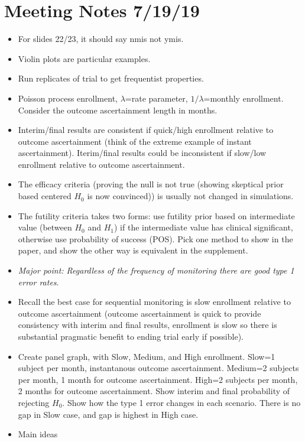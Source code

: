 \documentclass[12pt]{article}
\begin{document}
\section*{Meeting Notes 7/19/19}
\begin{itemize}
\item For slides 22/23, it should say nmis not ymis.
\item Violin plots are particular examples.
\item Run replicates of trial to get frequentist properties.
\item Poisson process enrollment, $\lambda$=rate parameter, $1/\lambda$=monthly enrollment. Consider the outcome ascertainment length in months.
\item Interim/final results are consistent if quick/high enrollment relative to outcome ascertainment (think of the extreme example of instant ascertainment). Iterim/final results could be inconsistent if slow/low enrollment relative to outcome ascertainment.
\item The efficacy criteria (proving the null is not true (showing skeptical prior based centered $H_0$ is now convinced)) is usually not changed in simulations.
\item The futility criteria takes two forms: use futility prior based on intermediate value (between $H_0$ and $H_1$) if the intermediate value has clinical significant, otherwise use probability of success (POS). Pick one method to show in the paper, and show the other way is equivalent in the supplement.
\item \textit{Major point: Regardless of the frequency of monitoring there are good type 1 error rates}.
\item Recall the best case for sequential monitoring is slow enrollment relative to outcome ascertainment (outcome ascertainment is quick to provide consistency with interim and final results, enrollment is slow so there is substantial pragmatic benefit to ending trial early if possible).
\item Create panel graph, with Slow, Medium, and High enrollment. Slow=1 subject per month, instantanous outcome ascertainment. Medium=2 subjects per month, 1 month for outcome ascertainment. High=2 subjects per month, 2 months for outcome ascertainment. Show interim and final probability of rejecting $H_0$. Show how the type 1 error changes in each scenario. There is no gap in Slow case, and gap is highest in High case.
\item Main ideas
\begin{enumerate}

\end{enumerate}
\end{itemize}
\end{document}
